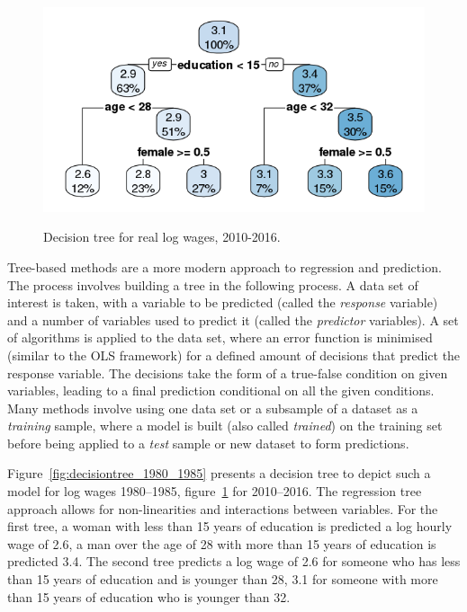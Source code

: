 \documentclass[notitlepage,12pt]{article}
\newcommand{\1}[1]{\ensuremath{\mathbb{1}\left( #1 \right)}}               %
\begin{document}
\begin{figure}
  \centering
  \caption{Decision tree for real log wages, 2010-2016.}
  \includegraphics[width=\textwidth]{figures/Rpat2010_2016.png}
  \label{fig:decisiontree_2010_2016}
\end{figure}

Tree-based methods are a more modern approach to regression and prediction.  The process involves building a tree in the following process.  A data set of interest is taken, with a variable to be predicted (called the \textit{response} variable) and a number of variables used to predict it (called the \textit{predictor} variables).  A set of algorithms is applied to the data set, where an error function is minimised (similar to the OLS framework) for a defined amount of decisions that predict the response variable.  The decisions take the form of a true-false condition on given variables, leading to a final prediction conditional on all the given conditions.  Many methods involve using one data set or a subsample of a dataset as a \textit{training} sample, where a model is built (also called \textit{trained}) on the training set before being applied to a \textit{test} sample or new dataset to form predictions.

Figure~\ref{fig:decisiontree_1980_1985} presents a decision tree to depict such a model for log wages 1980--1985, figure~\ref{fig:decisiontree_2010_2016} for 2010--2016.  The regression tree approach allows for non-linearities and interactions between variables.  For the first tree, a woman with less than 15 years of education is predicted a log hourly wage of 2.6, a man over the age of 28 with more than 15 years of education is predicted 3.4.  The second tree predicts a log wage of 2.6 for someone who has less than 15 years of education and is younger than 28, 3.1 for someone with more than 15 years of education who is younger than 32.
\end{document}
